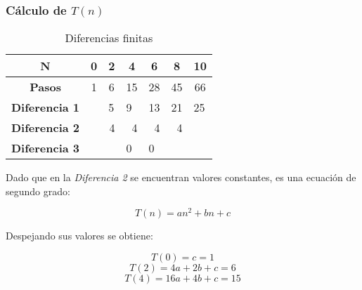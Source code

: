 \documentclass{uc3mpracticas}
\begin{document}
  \subsubsection{Cálculo de $T(n)$}





\begin{table}[!h]
  \centering
\begin{tabular}{|c|p{1cm}|p{1cm}|p{1cm}|p{1cm}|p{1cm}|p{1cm}|}
\hline
\textbf{N}     & \multicolumn{1}{c|}{\textbf{0}} & \multicolumn{1}{c|}{\textbf{2}} & \multicolumn{1}{c|}{\textbf{4}} & \multicolumn{1}{c|}{\textbf{6}} & \multicolumn{1}{c|}{\textbf{8}} & \multicolumn{1}{c|}{\textbf{10}} \\ \hline
\textbf{Pasos} & \multicolumn{1}{c|}{1}          & \multicolumn{1}{c|}{6}          & \multicolumn{1}{c|}{15}         & \multicolumn{1}{c|}{28}         & \multicolumn{1}{c|}{45}         & \multicolumn{1}{c|}{66}          \\ \hline
\textbf{Diferencia 1}                  &                                                         & 5                                                       & 9                               & 13                              & 21                              & 25                               \\ \hline
\textbf{Diferencia 2}                  &                                                         & \multicolumn{1}{r|}{4}                                  & \multicolumn{1}{r|}{4}          & \multicolumn{1}{r|}{4}          & \multicolumn{1}{r|}{4}          &                                  \\ \hline
\textbf{Diferencia 3}                  &                                                         &                                                         & 0                               & 0                               &                                 &                                  \\ \hline
\end{tabular}
\caption{Diferencias finitas}
\end{table}


  Dado que en la \textit{Diferencia 2} se encuentran valores constantes, es una ecuación de segundo grado:

  $$ T(n) = an^2 + bn + c $$

  Despejando sus valores se obtiene:

  $$ T(0) = c = 1 $$
  $$ T(2) = 4a + 2b + c = 6 $$
  $$ T(4) = 16a + 4b + c = 15 $$
\end{document}
